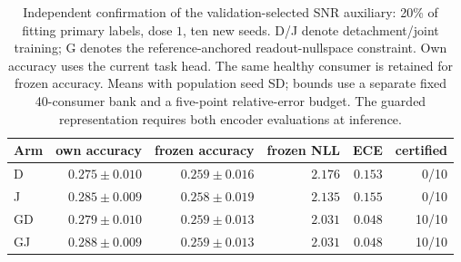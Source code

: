 \begin{table}[t]
\centering
\caption{Independent confirmation of the validation-selected SNR auxiliary: 20\% of fitting primary labels, dose $1$, ten new seeds. D/J denote detachment/joint training; G denotes the reference-anchored readout-nullspace constraint. Own accuracy uses the current task head. The same healthy consumer is retained for frozen accuracy. Means with population seed SD; bounds use a separate fixed 40-consumer bank and a five-point relative-error budget. The guarded representation requires both encoder evaluations at inference.}
\label{tab:benefit_confirmation}
\small
\begin{tabular}{lrrrrr}
\toprule
Arm & own accuracy & frozen accuracy & frozen NLL & ECE & certified \\
\midrule
D & $0.275\pm0.010$ & $0.259\pm0.016$ & $2.176$ & $0.153$ & 0/10 \\
J & $0.285\pm0.009$ & $0.258\pm0.019$ & $2.135$ & $0.155$ & 0/10 \\
GD & $0.279\pm0.010$ & $0.259\pm0.013$ & $2.031$ & $0.048$ & 10/10 \\
GJ & $0.288\pm0.009$ & $0.259\pm0.013$ & $2.031$ & $0.048$ & 10/10 \\
\bottomrule
\end{tabular}
\end{table}
